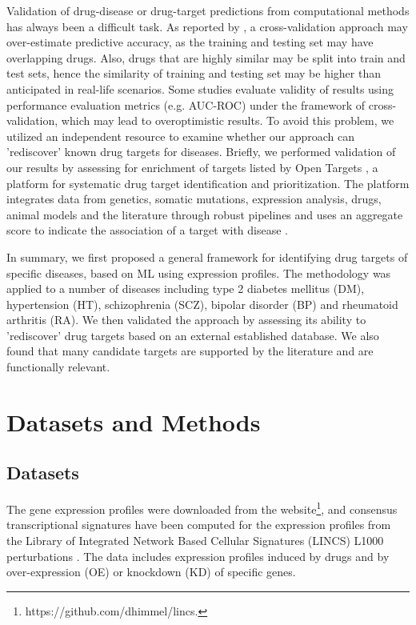     Validation of drug-disease or drug-target predictions from computational methods has always been a difficult task. As reported by \cite{guney2017reproducible}, a cross-validation approach may over-estimate predictive accuracy, as the training and testing set may have overlapping drugs. Also, drugs that are highly similar may be split into train and test sets, hence the similarity of training and testing set may be higher than anticipated in real-life scenarios. Some studies evaluate validity of results using performance evaluation metrics (e.g. AUC-ROC) under the framework of cross-validation, which may lead to overoptimistic results. To avoid this problem, we utilized an independent resource to examine whether our approach can 'rediscover' known drug targets for diseases. Briefly, we performed validation of our results by assessing for enrichment of targets listed by Open Targets \cite{koscielny2017open}, a platform for systematic drug target identification and prioritization. The platform integrates data from genetics, somatic mutations, expression analysis, drugs, animal models and the literature through robust pipelines and uses an aggregate score to indicate the association of a target with disease \cite{koscielny2017open}.

    In summary, we first proposed a general framework for identifying drug targets of specific diseases, based on ML using expression profiles. The methodology was applied to a number of diseases including type 2 diabetes mellitus (DM), hypertension (HT), schizophrenia (SCZ), bipolar disorder (BP) and  rheumatoid arthritis (RA). We then validated the approach by assessing its ability to 'rediscover' drug targets based on an external established database. We also found that many candidate targets are supported by the literature and are functionally relevant. 

\section{Datasets and Methods}
  \subsection{Datasets}
    The gene expression profiles were downloaded from the website\footnote{https://github.com/dhimmel/lincs.}, and consensus transcriptional signatures have been computed for the expression profiles from the Library of Integrated Network Based Cellular Signatures (LINCS) L1000 perturbations \cite{subramanian2017next}. The data includes expression profiles induced by drugs and by over-expression (OE) or knockdown (KD) of specific genes. 

